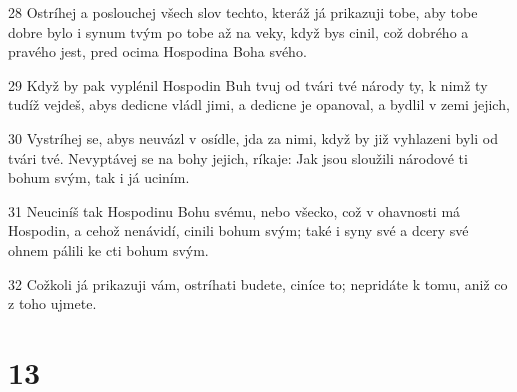 \par 28 Ostríhej a poslouchej všech slov techto, kteráž já prikazuji tobe, aby tobe dobre bylo i synum tvým po tobe až na veky, když bys cinil, což dobrého a pravého jest, pred ocima Hospodina Boha svého.
\par 29 Když by pak vyplénil Hospodin Buh tvuj od tvári tvé národy ty, k nimž ty tudíž vejdeš, abys dedicne vládl jimi, a dedicne je opanoval, a bydlil v zemi jejich,
\par 30 Vystríhej se, abys neuvázl v osídle, jda za nimi, když by již vyhlazeni byli od tvári tvé. Nevyptávej se na bohy jejich, ríkaje: Jak jsou sloužili národové ti bohum svým, tak i já uciním.
\par 31 Neuciníš tak Hospodinu Bohu svému, nebo všecko, což v ohavnosti má Hospodin, a cehož nenávidí, cinili bohum svým; také i syny své a dcery své ohnem pálili ke cti bohum svým.
\par 32 Cožkoli já prikazuji vám, ostríhati budete, ciníce to; nepridáte k tomu, aniž co z toho ujmete.

\chapter{13}

